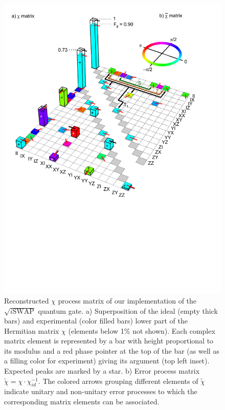 \begin{figure}[ht!]
	\centering
		\includegraphics[width=1.\textwidth]{./material/papers/iswap/figures/chi_matrix_and_error_process}
	\caption{Reconstructed $\chi$ process matrix of our implementation of the $\sqrt{i\mathrm{SWAP}}$ quantum gate. a) Superposition of the ideal (empty thick bars) and experimental
(color filled bars) lower part of the Hermitian matrix $\chi$ (elements
below 1\% not shown). Each complex matrix element is represented by
a bar with height proportional to its modulus and a red phase pointer
at the top of the bar (as well as a filling color for experiment)
giving its argument (top left inset). Expected peaks are marked by
a star. b) Error process matrix $\tilde{\chi}=\chi\cdot\chi_{id}^{-1}$. The colored arrows grouping different elements of $\tilde{\chi}$ indicate unitary and non-unitary error processes to which the corresponding matrix elements can be associated.}
	\label{fig:chi_matrix_and_errors}
\end{figure}

